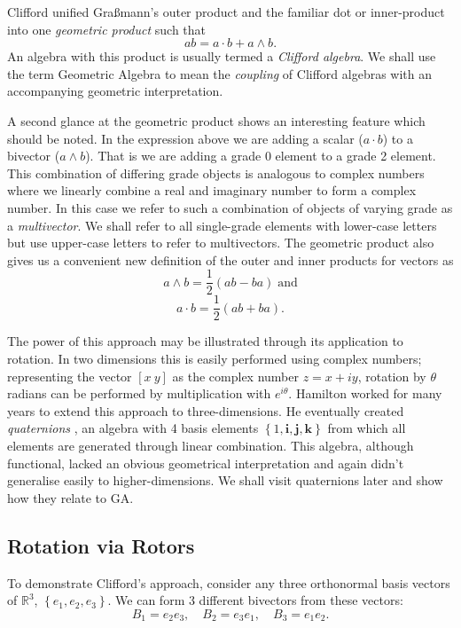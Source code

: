 Clifford unified Gra{\ss}mann's outer product and the familiar dot
or inner-product into one \emph{geometric product} such that
\begin{displaymath}
ab = a\cdot b + a \wedge b.
\end{displaymath}
An algebra with this product is usually termed a \emph{Clifford algebra}. We
shall use the term Geometric Algebra to mean the \emph{coupling} of Clifford
algebras with an accompanying geometric interpretation.

A second glance at the geometric product shows an interesting feature which
should be noted. In the expression above we are adding a scalar ($a \cdot b$)
to a bivector ($a \wedge b$). That is we are adding a grade 0 element to a
grade 2 element. This combination of differing grade objects is analogous to
complex numbers where we linearly combine a real and imaginary number to form
a complex number. In this case we refer to such a combination of objects of
varying grade as a \emph{multivector}.  We shall refer to all
single-grade elements with lower-case letters but use upper-case letters to
refer to multivectors. The geometric product also gives us a convenient new
definition of the outer and inner products for vectors as
\[
a \wedge b = \frac{1}{2}(ab - ba)\;\mbox{and}
\]
\[
a \cdot b = \frac{1}{2}(ab + ba).
\]

The power of this approach may be illustrated through its application to
rotation. In two dimensions this is easily performed using complex numbers;
representing the vector $[x\ y]$ as the complex number $z = x + iy$, rotation
by $\theta$ radians can be performed by multiplication with $e^{i\theta}$.
Hamilton worked for many years to extend this approach to
three-dimensions. He eventually created \emph{quaternions}
\cite{hamilton2,hamilton1}, an algebra with 4 basis elements $\left\{1,
\mathbf{i}, \mathbf{j}, \mathbf{k}\right\}$ from which all elements are
generated through linear combination. This algebra, although functional,
lacked an obvious geometrical interpretation and again didn't generalise
easily to higher-dimensions. We shall visit quaternions later and show how they relate to GA.

\subsection{Rotation via Rotors}

To demonstrate Clifford's approach, consider any three orthonormal basis
vectors of $\mathbb{R}^3$, $\left\{e_1, e_2, e_3\right\}$. We can form
3 different bivectors from these vectors:
\begin{displaymath}
B_1 = e_2e_3,\quad B_2 = e_3e_1,\quad B_3 = e_1e_2.
\end{displaymath}

